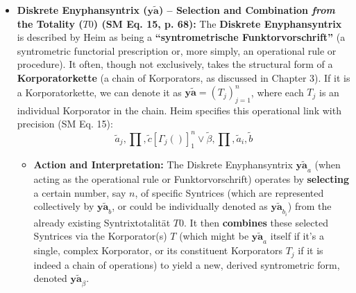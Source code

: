 \documentclass[12pt]{article}
\newcommand{\q}[1]{\enquote{#1}}
\newcommand{\syntrixtotalitaet}{T0}
\newcommand{\diskreteEnyphansyntrix}{\bm{y\widetilde{a}}}
\begin{document}
\begin{itemize}
    \item \textbf{Diskrete Enyphansyntrix (\( \diskreteEnyphansyntrix \)) – Selection and Combination \textit{from} the Totality (\(\syntrixtotalitaet\)) (SM Eq. 15, p. 68):}
    The \textbf{Diskrete Enyphansyntrix} is described by Heim as being a \textbf{\q{syntrometrische Funktorvorschrift}} (a syntrometric functorial prescription or, more simply, an operational rule or procedure). It often, though not exclusively, takes the structural form of a \textbf{Korporatorkette} (a chain of Korporators, as discussed in Chapter 3). If it is a Korporatorkette, we can denote it as \( \diskreteEnyphansyntrix = (T_j)^n_{j=1} \), where each \( T_j \) is an individual Korporator in the chain. Heim specifies this operational link with precision (SM Eq. 15):
    \begin{equation}
    \widetilde{a}_j, \prod, \widetilde{c} [ \Gamma_j( ) ]_1^n \vee \widetilde{\beta}, \prod, \widetilde{a}_i, \widetilde{b}
    \label{eq:original_diskrete_enyphansyntrix}
    \end{equation}
    \begin{itemize}
        \item \textbf{Action and Interpretation:} The Diskrete Enyphansyntrix \( \diskreteEnyphansyntrix_a \) (when acting as the operational rule or Funktorvorschrift) operates by \textbf{selecting} a certain number, say \( n \), of specific Syntrices (which are represented collectively by \( \diskreteEnyphansyntrix_b \), or could be individually denoted as \( \diskreteEnyphansyntrix_{b_i} \)) from the already existing Syntrixtotalität \( \syntrixtotalitaet \). It then \textbf{combines} these selected Syntrices via the Korporator(s) \( T \) (which might be \( \diskreteEnyphansyntrix_a \) itself if it's a single, complex Korporator, or its constituent Korporators \( T_j \) if it is indeed a chain of operations) to yield a new, derived syntrometric form, denoted \( \diskreteEnyphansyntrix_\beta \).

\end{itemize}
\end{itemize}
\end{document}
